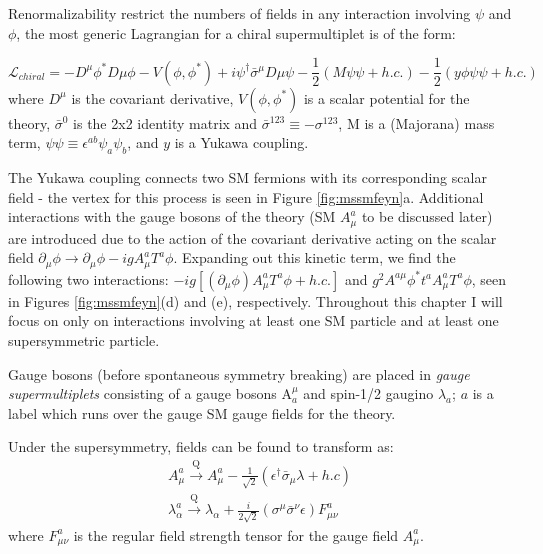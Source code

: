 Renormalizability restrict the numbers of fields in any interaction involving $\psi$ and $\phi$, the most generic Lagrangian for a chiral supermultiplet is of the form:

\begin{equation}
\label{eq:lchiral}
\mathcal{L}_{chiral} = - D^{\mu}\phi^{*}D{\mu}\phi - V(\phi, \phi^{*}) + i \psi^{\dagger}\bar{\sigma}^{\mu} D{\mu}\psi - \frac{1}{2} (M \psi \psi + h.c.) - \frac{1}{2} (y \phi  \psi \psi + h.c.)
\end{equation}
where $D^{\mu}$ is the covariant derivative, $V(\phi, \phi^{*})$ is a scalar potential for the theory, $\bar{\sigma}^{0}$ is the 2x2 identity matrix and $\bar{\sigma}^{123}\equiv-\sigma^{123}$, M is a (Majorana) mass term, $\psi\psi\equiv\epsilon^{ab}\psi_{a}\psi_{b}$, and $y$ is a Yukawa coupling.

The Yukawa coupling connects two SM fermions with its corresponding scalar field - the vertex for this process is seen in Figure \ref{fig:mssmfeyn}a. Additional interactions with the gauge bosons of the theory (SM $A^{a}_{\mu}$ to be discussed later) are introduced due to the action of the covariant derivative acting on the scalar field $\partial_{\mu} \phi \rightarrow \partial_{\mu}\phi -igA^{a}_{\mu}T^{a}\phi$. Expanding out this kinetic term, we find the following two interactions: $-ig[(\partial_{\mu}\phi)A^{a}_{\mu}T^{a}\phi+h.c.]$ and $g^{2}A^{a\mu}\phi^{*}t^{a}A^{a}_{\mu}T^{a}\phi$, seen in Figures \ref{fig:mssmfeyn}(d) and (e), respectively. Throughout this chapter I will focus on only on interactions involving at least one SM particle and at least one supersymmetric particle.

Gauge bosons (before spontaneous symmetry breaking) are placed in \textit{gauge supermultiplets} consisting of a gauge bosons A$^{\mu}_{a}$ and spin-1/2 gaugino $\lambda_{a}$; $a$ is a label which runs over the gauge SM gauge fields for the theory.

Under the supersymmetry, fields can be found to transform as:
\begin{equation}
\begin{array}{l}
A_{\mu}^{a} \xrightarrow[]{\text{Q}} A_{\mu}^{a} - \frac{1}{\sqrt{2}} ( \epsilon^{\dagger} \bar{\sigma}_{\mu} \lambda + h.c)\\
\lambda_{\alpha}^{a} \xrightarrow[]{\text{Q}} \lambda_{\alpha} + \frac{i}{2\sqrt{2}}(\sigma^{\mu}\bar{\sigma}^{\nu}\epsilon)F_{\mu\nu}^{a}
\end{array}
\end{equation}
where $F_{\mu\nu}^{a}$ is the regular field strength tensor for the gauge field $A_{\mu}^{a}$.

